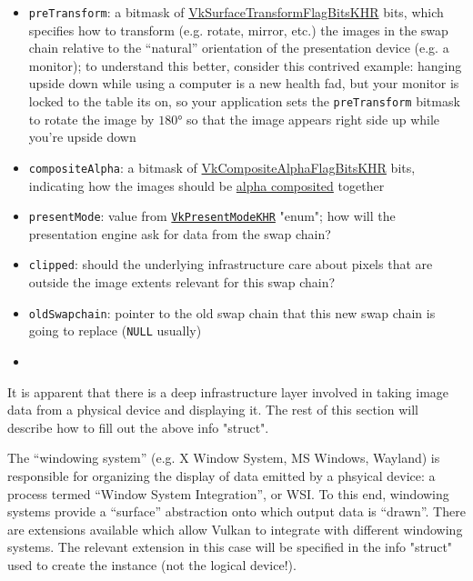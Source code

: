 \documentclass[12pt,letterpaper]{article}
\newcommand{\inquotes}[1]{``#1''}	%
\newcommand{\cil}[1]{\texttt{#1}}
\begin{document}
\begin{itemize}
		\item \cil{preTransform}: a bitmask of \href{http://vulkan-spec-chunked.ahcox.com/ch29s05.html#VkSurfaceTransformFlagBitsKHR}{VkSurfaceTransformFlagBitsKHR} bits, which specifies how to transform (e.g. rotate, mirror, etc.) the images in the swap chain relative to the \inquotes{natural} orientation of the presentation device (e.g. a monitor); to understand this better, consider this contrived example: hanging upside down while using a computer is a new health fad, but your monitor is locked to the table its on, so your application sets the \cil{preTransform} bitmask to rotate the image by $\ang{180}$ so that the image appears right side up while you're upside down
		
		\item \cil{compositeAlpha}: a bitmask of \href{http://vulkan-spec-chunked.ahcox.com/ch29s05.html#VkCompositeAlphaFlagBitsKHR}{VkCompositeAlphaFlagBitsKHR} bits, indicating how the images should be \href{https://en.wikipedia.org/wiki/Alpha_compositing}{alpha composited} together
		
		\item \cil{presentMode}: value from \href{http://vulkan-spec-chunked.ahcox.com/ch29s05.html#VkPresentModeKHR}{\cil{VkPresentModeKHR}} "enum"; how will the presentation engine ask for data from the swap chain?
		
		\item \cil{clipped}: should the underlying infrastructure care about pixels that are outside the image extents relevant for this swap chain?
		
		\item \cil{oldSwapchain}: pointer to the old swap chain that this new swap chain is going to replace (\cil{NULL} usually)
		\item 
	\end{itemize}
	
	It is apparent that there is a deep infrastructure layer involved in taking image data from a physical device and displaying it. The rest of this section will describe how to fill out the above info "struct".
	
	The \inquotes{windowing system} (e.g. X Window System, MS Windows, Wayland) is responsible for organizing the display of data emitted by a phsyical device: a process termed \inquotes{Window System Integration}, or WSI. To this end, windowing systems provide a \inquotes{surface} abstraction onto which output data is \inquotes{drawn}. There are extensions available which allow Vulkan to integrate with different windowing systems. The relevant extension in this case will be specified in the info "struct" used to create the instance (not the logical device!).
	
\end{document}
